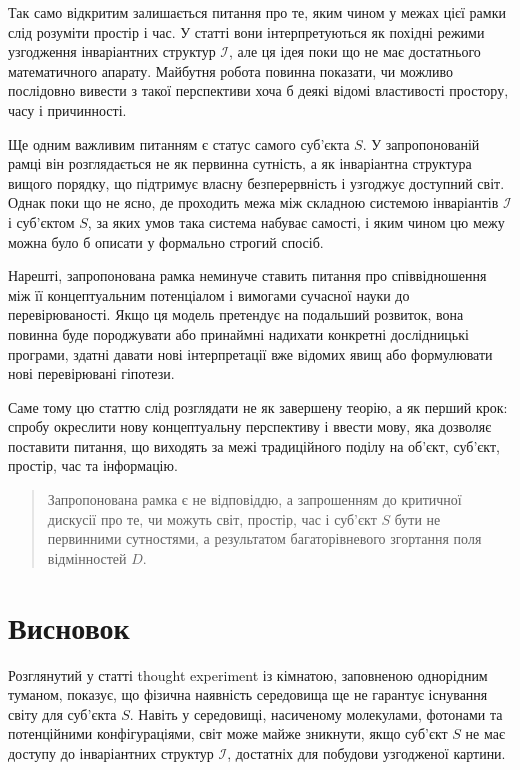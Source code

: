 \documentclass[aps,prd,onecolumn,nofootinbib,superscriptaddress]{revtex4-2}
\begin{document}
Так само відкритим залишається питання про те, яким чином у межах цієї рамки слід розуміти простір і час. У статті вони інтерпретуються як похідні режими узгодження інваріантних структур \(\mathcal{I}\), але ця ідея поки що не має достатнього математичного апарату. Майбутня робота повинна показати, чи можливо послідовно вивести з такої перспективи хоча б деякі відомі властивості простору, часу і причинності.

Ще одним важливим питанням є статус самого суб’єкта \(S\). У запропонованій рамці він розглядається не як первинна сутність, а як інваріантна структура вищого порядку, що підтримує власну безперервність і узгоджує доступний світ. Однак поки що не ясно, де проходить межа між складною системою інваріантів \(\mathcal{I}\) і суб’єктом \(S\), за яких умов така система набуває самості, і яким чином цю межу можна було б описати у формально строгий спосіб.

Нарешті, запропонована рамка неминуче ставить питання про співвідношення між її концептуальним потенціалом і вимогами сучасної науки до перевірюваності. Якщо ця модель претендує на подальший розвиток, вона повинна буде породжувати або принаймні надихати конкретні дослідницькі програми, здатні давати нові інтерпретації вже відомих явищ або формулювати нові перевірювані гіпотези.

Саме тому цю статтю слід розглядати не як завершену теорію, а як перший крок: спробу окреслити нову концептуальну перспективу і ввести мову, яка дозволяє поставити питання, що виходять за межі традиційного поділу на об’єкт, суб’єкт, простір, час та інформацію.

\begin{quote}
Запропонована рамка є не відповіддю, а запрошенням до критичної дискусії про те, чи можуть світ, простір, час і суб’єкт \(S\) бути не первинними сутностями, а результатом багаторівневого згортання поля відмінностей \(D\).
\end{quote}

\section{Висновок}

Розглянутий у статті thought experiment із кімнатою, заповненою однорідним туманом, показує, що фізична наявність середовища ще не гарантує існування світу для суб’єкта \(S\). Навіть у середовищі, насиченому молекулами, фотонами та потенційними конфігураціями, світ може майже зникнути, якщо суб’єкт \(S\) не має доступу до інваріантних структур \(\mathcal{I}\), достатніх для побудови узгодженої картини.
\end{document}
